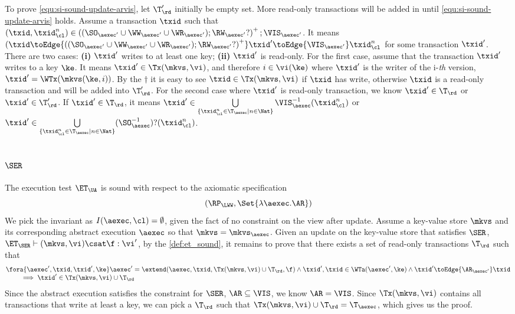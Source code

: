 To prove \cref{equ:si-sound-update-arvis}, 
let \( \T'_\rd \) initially be empty set.
More read-only transactions will be added in until \cref{equ:si-sound-update-arvis} holds.
Assume a transaction \( \txid \) such that \( (\txid, \txid_\cl^n) \in \left( (\SO_{\aexec'} \cup \WW_{\aexec'} \cup \WR_{\aexec'} ) ; \RW_{\aexec'}? \right)^+ ; \VIS_{\aexec'} \).
It means \( (\txid \toEdge{\left( (\SO_{\aexec'} \cup \WW_{\aexec'} \cup \WR_{\aexec'} ) ; \RW_{\aexec'}? \right)^+ } \txid' \toEdge{\VIS_{\aexec'}}  \txid_\cl^n \) for some transaction \( \txid' \).
There are two cases: \textbf{(i)} \( \txid' \) writes to at least one key; \textbf{(ii)} \( \txid' \) is read-only.
For the first case, assume that the transaction \( \txid' \) writes to a key \( \ke \).
It means \(  \txid' \in \Tx(\mkvs, \vi) \), 
and therefore \( i \in \vi(\ke) \) where \( \txid' \) is the writer of the i-\emph{th} version, \ie \( \txid' = \WTx(\mkvs(\ke, i)) \).
By the \( \dagger \) it is easy to see \( \txid \in \Tx(\mkvs,\vi) \) if \( \txid \) has write,
otherwise \( \txid \) is a read-only transaction and will be added into \( \T'_\rd \).
For the second case where \( \txid' \) is read-only transaction, we know \( \txid' \in \T_\rd \) or \( \txid' \in \T'_\rd \).
If \( \txid' \in \T_\rd \), it means \( \txid' \in \bigcup\limits_{\{\txid_{\cl}^{n} \in \T_{\aexec} \mid n \in \Nat\}} \VIS_{\aexec}^{-1}(\txid^n_\cl) \) or  \( \txid' \in \bigcup\limits_{\{\txid_{\cl}^{n} \in \T_{\aexec} \mid n \in \Nat\}} (\SO_{\aexec}^{-1})?(\txid^n_\cl) \).


\subsection{ \( \SER \)}

The execution test $\ET_\UA$ is sound with respect to the axiomatic specification 
\[ 
    (\RP_{\LWW}, \Set{\lambda \aexec. \AR })
\]
We pick the invariant as \( I( \aexec, \cl ) = \emptyset \), given the fact of no constraint on the view after update.
Assume a key-value store \( \mkvs \) and its corresponding abstract execution \( \aexec \) so that \( \mkvs = \mkvs_\aexec \).
Given an update on the key-value store that satisfies \( \SER \), \ie \(\ET_\SER \vdash (\mkvs, \vi) \csat \f : \vi' \),
by the \cref{def:et_sound}, it remains to prove that there exists a set of read-only transactions \( \T_\rd \) such that
\[
    \begin{array}{@{}l@{}}
        \fora{ \aexec', \txid, \txid', \ke } 
        \aexec' = \extend(\aexec, \txid, \Tx(\mkvs, \vi) \cup \T_\rd, \f ) 
        \land \txid', \txid \in \WTa(\aexec', \ke) \land  \txid' \toEdge{\AR_{\aexec'}} \txid  \\
        \qquad {} \implies \txid' \in \Tx(\mkvs, \vi) \cup \T_\rd
    \end{array}
\]
Since the abstract execution satisfies the constraint for \( \SER \), \ie \( \AR \subseteq \VIS \), we know \( \AR = \VIS \).
Since \( \Tx(\mkvs, \vi)  \) contains all transactions that write at least a key, 
we can pick a \( \T_\rd \) such that \( \Tx(\mkvs, \vi) \cup \T_\rd = \T_\aexec\),
which gives us the proof.


